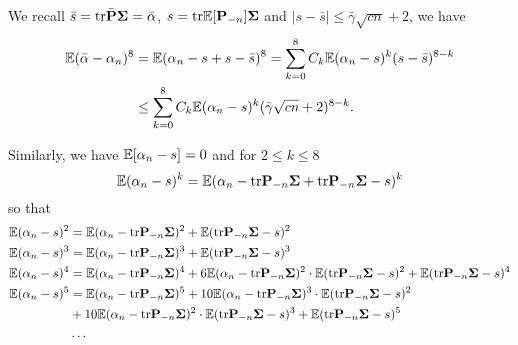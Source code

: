 \documentclass[11pt]{article}
\begin{document}
\bigskip

We recall $\bar s = \mathrm{tr} \bar {\mathbf P} \mathbf{\Sigma} = \bar \alpha$, $s = \mathrm{tr} \mathbb E[\mathbf P_{-n}] \mathbf{\Sigma}$ and $|s - \bar s| \le \bar \gamma \sqrt{cn} + 2$, we have
\begin{align}
  \mathbb E (\bar \alpha - \alpha_n)^8 &= \mathbb E (\alpha_n - s + s - \bar s)^8 = \sum_{k=0}^8 C_k \mathbb E(\alpha_n - s )^k (s-\bar s)^{8-k} \nonumber \\ 
  &\le \sum_{k=0}^8 C_k \mathbb E(\alpha_n - s )^k (\bar \gamma \sqrt{cn} + 2)^{8-k}. \label{eq:diff}
\end{align}

Similarly, we have $\mathbb E [\alpha_n - s] = 0$ and for $2 \le k \le 8$
\[
  \mathbb E(\alpha_n - s )^k = \mathbb E (\alpha_n - \mathrm{tr} \mathbf P_{-n} \mathbf{\Sigma} + \mathrm{tr} \mathbf P_{-n} \mathbf{\Sigma} - s)^k
\]
so that
\begin{align*}
  \mathbb E(\alpha_n - s )^2 &= \mathbb E (\alpha_n - \mathrm{tr} \mathbf P_{-n} \mathbf{\Sigma})^2 + \mathbb E (\mathrm{tr} \mathbf P_{-n} \mathbf{\Sigma} - s)^2 \\ 
  \mathbb E(\alpha_n - s )^3 &= \mathbb E (\alpha_n - \mathrm{tr} \mathbf P_{-n} \mathbf{\Sigma})^3 + \mathbb E (\mathrm{tr} \mathbf P_{-n} \mathbf{\Sigma} - s)^3 \\ 
  \mathbb E(\alpha_n - s )^4 &= \mathbb E (\alpha_n - \mathrm{tr} \mathbf P_{-n} \mathbf{\Sigma})^4 + 6 \mathbb E(\alpha_n - \mathrm{tr} \mathbf P_{-n} \mathbf{\Sigma})^2 \cdot \mathbb E (\mathrm{tr} \mathbf P_{-n} \mathbf{\Sigma} - s)^2 + \mathbb E (\mathrm{tr} \mathbf P_{-n} \mathbf{\Sigma} - s)^4 \\ 
  \mathbb E(\alpha_n - s )^5 &= \mathbb E (\alpha_n - \mathrm{tr} \mathbf P_{-n} \mathbf{\Sigma})^5 + 10 \mathbb E(\alpha_n - \mathrm{tr} \mathbf P_{-n} \mathbf{\Sigma})^3 \cdot \mathbb E (\mathrm{tr} \mathbf P_{-n} \mathbf{\Sigma} - s)^2 \\ 
  &+ 10 \mathbb E(\alpha_n - \mathrm{tr} \mathbf P_{-n} \mathbf{\Sigma})^2 \cdot \mathbb E (\mathrm{tr} \mathbf P_{-n} \mathbf{\Sigma} - s)^3 + \mathbb E (\mathrm{tr} \mathbf P_{-n} \mathbf{\Sigma} - s)^5 \\ 
  &\ldots
\end{align*}
\end{document}
